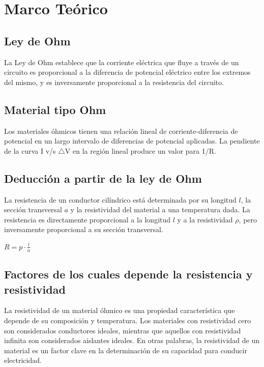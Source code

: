 \documentclass[letterpaper, 12pt]{report}
\begin{document}
\newpage

\section{Marco Teórico}

\subsection*{Ley de Ohm}

La Ley de Ohm establece que la corriente eléctrica que fluye a través de un
circuito es proporcional a la diferencia de potencial eléctrico entre los
extremos del mismo, y es inversamente proporcional a la resistencia del
circuito.~\cite{LeyDeOhm}

\subsection*{Material tipo Ohm}

Los materiales óhmicos tienen una relación lineal de corriente-diferencia de
potencial en un largo intervalo de diferencias de potencial aplicadas.
La pendiente de la curva I v/s $\triangle$V en la región lineal produce un
valor para 1/R.~\cite{MaterialesOhmicos}

\subsection*{Deducción a partir de la ley de Ohm}

La resistencia de un conductor cilíndrico está determinada por su longitud $l$,
la sección transversal $a$ y la resistividad del material a una temperatura dada.
La resistencia es directamente proporcional a la longitud $l$ y a la
resistividad $\rho$, pero inversamente proporcional a su sección transversal.

$R = p \cdot \frac{l}{a}$

\subsection*{Factores de los cuales depende la resistencia y resistividad}

La resistividad de un material óhmico es una propiedad característica que
depende de su composición y temperatura. Los materiales con resistividad
cero son considerados conductores ideales, mientras que aquellos con
resistividad infinita son considerados aislantes ideales. En otras
palabras, la resistividad de un material es un factor clave en la
determinación de su capacidad para conducir electricidad.
\end{document}
